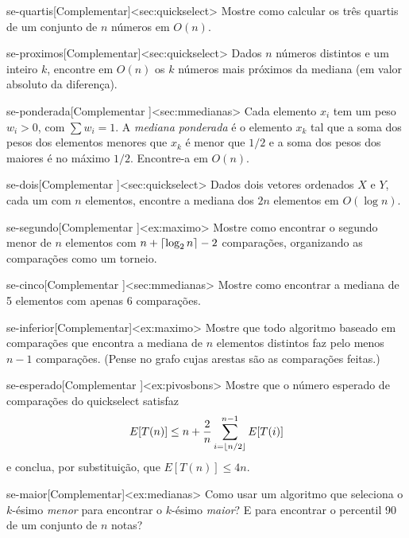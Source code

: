 \begin{exercicio}{se-quartis}[Complementar]<sec:quickselect>
Mostre como calcular os três quartis de um conjunto de $n$ números em $O(n)$.
\end{exercicio}
\begin{exercicio}{se-proximos}[Complementar]<sec:quickselect>
Dados $n$ números distintos e um inteiro $k$, encontre em $O(n)$ os $k$ números mais próximos da mediana (em valor absoluto da diferença).
\end{exercicio}
\begin{exercicio}{se-ponderada}[Complementar \estrela]<sec:mmedianas>
Cada elemento $x_i$ tem um peso $w_i>0$, com $\sum w_i=1$. A \emph{mediana ponderada} é o elemento $x_k$ tal que a soma dos pesos dos elementos menores que $x_k$ é menor que $1/2$ e a soma dos pesos dos maiores é no máximo $1/2$. Encontre-a em $O(n)$.
\end{exercicio}
\begin{exercicio}{se-dois}[Complementar \estrela]<sec:quickselect>
Dados dois vetores ordenados $X$ e $Y$, cada um com $n$ elementos, encontre a mediana dos $2n$ elementos em $O(\log n)$.
\end{exercicio}
\begin{exercicio}{se-segundo}[Complementar \estrela]<ex:maximo>
Mostre como encontrar o segundo menor de $n$ elementos com $n+\lceil\log_2n\rceil-2$ comparações, organizando as comparações como um torneio.
\end{exercicio}
\begin{exercicio}{se-cinco}[Complementar \estrela]<sec:mmedianas>
Mostre como encontrar a mediana de 5 elementos com apenas 6 comparações.
\end{exercicio}
\begin{exercicio}{se-inferior}[Complementar]<ex:maximo>
Mostre que todo algoritmo baseado em comparações que encontra a mediana de $n$ elementos distintos faz pelo menos $n-1$ comparações. (Pense no grafo cujas arestas são as comparações feitas.)
\end{exercicio}
\begin{exercicio}{se-esperado}[Complementar \estrela]<ex:pivosbons>
Mostre que o número esperado de comparações do quickselect satisfaz \[E[T(n)]\le n+\frac2n\sum_{i=\lfloor n/2\rfloor}^{n-1}E[T(i)]\] e conclua, por substituição, que $E[T(n)]\le4n$.
\end{exercicio}
\begin{exercicio}{se-maior}[Complementar]<ex:medianas>
Como usar um algoritmo que seleciona o $k$-ésimo \emph{menor} para encontrar o $k$-ésimo \emph{maior}? E para encontrar o percentil 90 de um conjunto de $n$ notas?
\end{exercicio}
